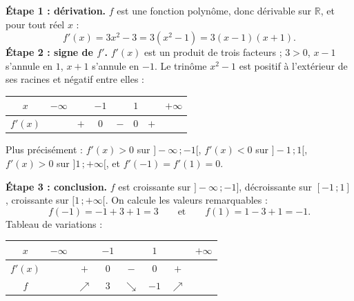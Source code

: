 \documentclass[11pt]{article}
\begin{document}
\begin{exemplebox}[Variations de $f(x) = x^3 - 3x + 1$ sur $\mathbb{R}$]
\textbf{Étape 1 : dérivation.} $f$ est une fonction polynôme, donc dérivable sur $\mathbb{R}$, et pour tout réel $x$ :
\[ f'(x) = 3x^2 - 3 = 3(x^2 - 1) = 3(x-1)(x+1). \]
\textbf{Étape 2 : signe de $f'$.} $f'(x)$ est un produit de trois facteurs ; $3 > 0$, $x-1$ s'annule en $1$, $x+1$ s'annule en $-1$. Le trinôme $x^2-1$ est positif à l'extérieur de ses racines et négatif entre elles :
\begin{center}
\begin{tabular}{|c|ccccccc|}\hline
$x$ & $-\infty$ & & $-1$ & & $1$ & & $+\infty$ \\ \hline
$f'(x)$ & & $+$ & $0$ & $-$ & $0$ & $+$ & \\ \hline
\end{tabular}
\end{center}
Plus précisément : $f'(x) > 0$ sur $]-\infty\,;-1[$, $f'(x) < 0$ sur $]-1\,;1[$, $f'(x) > 0$ sur $]1\,;+\infty[$, et $f'(-1) = f'(1) = 0$.

\textbf{Étape 3 : conclusion.} $f$ est croissante sur $]-\infty\,;-1]$, décroissante sur $[-1\,;1]$, croissante sur $[1\,;+\infty[$. On calcule les valeurs remarquables :
\[ f(-1) = -1 + 3 + 1 = 3 \qquad \text{et} \qquad f(1) = 1 - 3 + 1 = -1. \]
Tableau de variations :
\begin{center}
\begin{tabular}{|c|ccccccc|}\hline
$x$ & $-\infty$ & & $-1$ & & $1$ & & $+\infty$ \\ \hline
$f'(x)$ & & $+$ & $0$ & $-$ & $0$ & $+$ & \\ \hline
$f$ & & $\nearrow$ & $3$ & $\searrow$ & $-1$ & $\nearrow$ & \\ \hline
\end{tabular}
\end{center}
\end{exemplebox}
\end{document}
